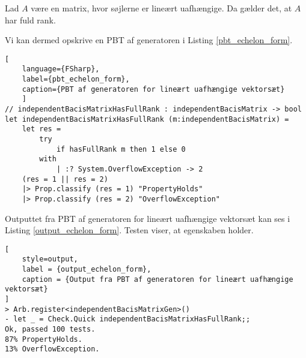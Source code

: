 \vspace{0.5cm}
\begin{egenskab}
    Lad \( A \) være en matrix, hvor søjlerne er lineært uafhængige. Da gælder det, at \( A \) har fuld rank.
\end{egenskab}

Vi kan dermed opskrive en PBT af generatoren i Listing \ref{pbt_echelon_form}.

\begin{lstlisting}[
    language={FSharp}, 
    label={pbt_echelon_form}, 
    caption={PBT af generatoren for lineært uafhængige vektorsæt}
    ]
// independentBacisMatrixHasFullRank : independentBacisMatrix -> bool
let independentBacisMatrixHasFullRank (m:independentBacisMatrix) =
    let res =
        try 
            if hasFullRank m then 1 else 0
        with
            | :? System.OverflowException -> 2
    (res = 1 || res = 2)
    |> Prop.classify (res = 1) "PropertyHolds"
    |> Prop.classify (res = 2) "OverflowException"
\end{lstlisting}

Outputtet fra PBT af generatoren for lineært uafhængige vektorsæt kan ses i Listing \ref{output_echelon_form}. Testen viser, at egenskaben holder.

\begin{lstlisting}[
    style=output,
    label = {output_echelon_form},
    caption = {Output fra PBT af generatoren for lineært uafhængige vektorsæt}
]
> Arb.register<independentBacisMatrixGen>()
- let _ = Check.Quick independentBacisMatrixHasFullRank;;
Ok, passed 100 tests.
87% PropertyHolds.
13% OverflowException.
\end{lstlisting}
